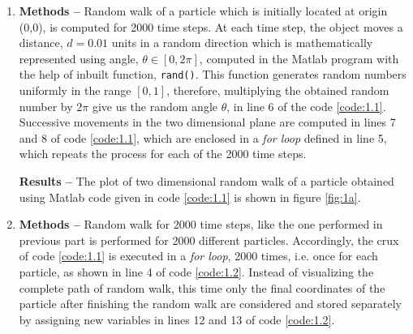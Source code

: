 \documentclass[a4paper]{article}
\begin{document}
		\begin{enumerate} [label*=\textbf{(\alph*)}]
			
			
			\item 
				\subitem \textbf{Methods  --} 
					Random walk of a particle which is initially located at origin (0,0), is computed for 2000 time steps. At each time step, the object moves a distance, \(d=0.01\) units in a random direction which is mathematically represented using angle, \(\theta \in [0,2\pi]\), computed in the Matlab program with the help of inbuilt function, \texttt{rand()}. This function generates random numbers uniformly in the range \([0,1]\), therefore, multiplying the obtained random number by \(2\pi\) give us the random angle \(\theta\), in line 6 of the code \ref{code:1.1}. Successive movements in the two dimensional plane are computed in lines 7 and 8 of code \ref{code:1.1}, which are enclosed in a \emph{for loop} defined in line 5, which repeats the process for each of the 2000 time steps.
					
					\begin{figure} [h]
						
					\end{figure}
					
				\subitem \textbf{Results --} 
					The plot of two dimensional random walk of a particle obtained using Matlab code given in code \ref{code:1.1} is shown in figure \ref{fig:1a}.
				
			
			
			\item 
				\subitem \textbf{Methods  --} 
					Random walk for 2000 time steps, like the one performed in previous part is performed for 2000 different particles. Accordingly, the crux of code \ref{code:1.1} is executed in a \emph{for loop}, 2000 times, i.e. once for each particle, as shown in line 4 of code \ref{code:1.2}. Instead of visualizing the complete path of random walk, this time only the final coordinates of the particle after finishing the random walk are considered and stored separately by assigning new variables in lines 12 and 13 of code \ref{code:1.2}.   
					
					\begin{figure} [h]
						
					\end{figure}
					

\end{enumerate}
\end{document}
